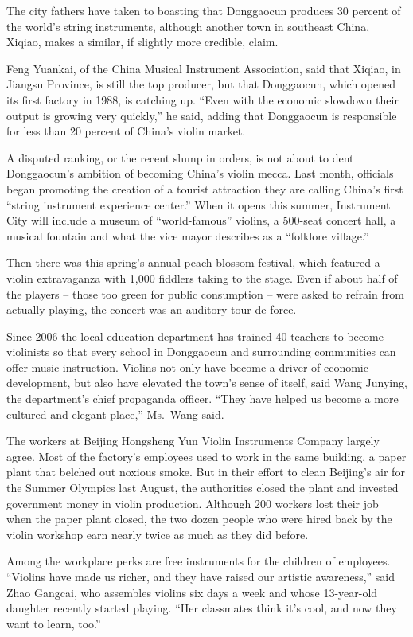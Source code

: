 ﻿\documentclass[12pt]{article}
\begin{document}
The city fathers have taken to boasting that Donggaocun produces 30 percent of the world's string
instruments, although another town in southeast China, Xiqiao, makes a similar, if slightly more
credible, claim.

Feng Yuankai, of the China Musical Instrument Association, said that Xiqiao, in Jiangsu Province, is
still the top producer, but that Donggaocun, which opened its first factory in 1988, is catching up.
``Even with the economic slowdown their output is growing very quickly,'' he said, adding that
Donggaocun is responsible for less than 20 percent of China's violin market.

A disputed ranking, or the recent slump in orders, is not about to dent Donggaocun's ambition of
becoming China's violin mecca. Last month, officials began promoting the creation of a tourist
attraction they are calling China's first ``string instrument experience center.'' When it opens
this summer, Instrument City will include a museum of ``world-famous'' violins, a 500-seat concert
hall, a musical fountain and what the vice mayor describes as a ``folklore village.''

Then there was this spring's annual peach blossom festival, which featured a violin extravaganza
with 1,000 fiddlers taking to the stage. Even if about half of the players -- those too green for
public consumption -- were asked to refrain from actually playing, the concert was an auditory tour
de force.

Since 2006 the local education department has trained 40 teachers to become violinists so that every
school in Donggaocun and surrounding communities can offer music instruction. Violins not only have
become a driver of economic development, but also have elevated the town's sense of itself, said
Wang Junying, the department's chief propaganda officer. ``They have helped us become a more
cultured and elegant place,'' Ms.~Wang said.

The workers at Beijing Hongsheng Yun Violin Instruments Company largely agree. Most of the factory's
employees used to work in the same building, a paper plant that belched out noxious smoke. But in
their effort to clean Beijing's air for the Summer Olympics last August, the authorities closed the
plant and invested government money in violin production. Although 200 workers lost their job when
the paper plant closed, the two dozen people who were hired back by the violin workshop earn nearly
twice as much as they did before.

Among the workplace perks are free instruments for the children of employees. ``Violins have made us
richer, and they have raised our artistic awareness,'' said Zhao Gangcai, who assembles violins six
days a week and whose 13-year-old daughter recently started playing. ``Her classmates think it's
cool, and now they want to learn, too.''
\end{document}
